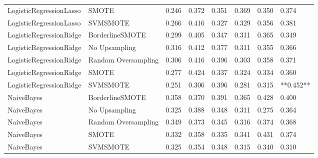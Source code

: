 \begin{tabular}{llllllll}
     LogisticRegressionLasso &               SMOTE & 0.246 &                     0.372 &                 0.351 &                  0.369 &                                   0.350 &     0.374 \\
     LogisticRegressionLasso &            SVMSMOTE & 0.266 &                     0.416 &                 0.327 &                  0.329 &                                   0.356 &     0.381 \\
     LogisticRegressionRidge &     BorderlineSMOTE & 0.299 &                     0.405 &                 0.347 &                  0.311 &                                   0.365 &     0.349 \\
     LogisticRegressionRidge &       No Upsampling & 0.316 &                     0.412 &                 0.377 &                  0.311 &                                   0.355 &     0.366 \\
     LogisticRegressionRidge & Random Oversampling & 0.306 &                     0.416 &                 0.396 &                  0.303 &                                   0.358 &     0.371 \\
     LogisticRegressionRidge &               SMOTE & 0.277 &                     0.424 &                 0.337 &                  0.324 &                                   0.334 &     0.360 \\
     LogisticRegressionRidge &            SVMSMOTE & 0.251 &                     0.306 &                 0.396 &                  0.281 &                                   0.315 & **0.452** \\
                  NaiveBayes &     BorderlineSMOTE & 0.358 &                     0.370 &                 0.391 &                  0.365 &                                   0.428 &     0.400 \\
                  NaiveBayes &       No Upsampling & 0.325 &                     0.388 &                 0.348 &                  0.311 &                                   0.275 &     0.364 \\
                  NaiveBayes & Random Oversampling & 0.349 &                     0.373 &                 0.345 &                  0.316 &                                   0.374 &     0.368 \\
                  NaiveBayes &               SMOTE & 0.332 &                     0.358 &                 0.335 &                  0.341 &                                   0.431 &     0.374 \\
                  NaiveBayes &            SVMSMOTE & 0.325 &                     0.354 &                 0.348 &                  0.315 &                                   0.340 &     0.310 \\

\end{tabular}
